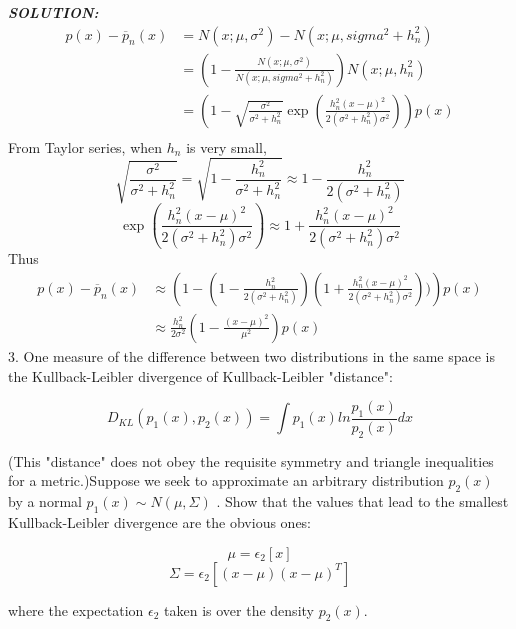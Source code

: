 \documentclass{article}
\theoremstyle{definition}
\theoremstyle{definition}
\theoremstyle{remark}
\begin{document}
\emph{\textbf{SOLUTION:}}\\
\begin{equation}\nonumber
\begin{aligned}
p(x)-\overline{p}_n(x) &= N(x;\mu,\sigma^2)-N(x;\mu,sigma^2+h_n^2)\\
&= (1-\frac{N(x;\mu,\sigma^2)}{N(x;\mu,sigma^2+h_n^2)})N(x;\mu,h_n^2)\\
&= \left(1-\sqrt{\frac{\sigma^2}{\sigma^2+h_n^2}}\exp(\frac{h_n^2(x-\mu)^2}{2(\sigma^2+h_n^2)\sigma^2})\right)p(x)\\
\end{aligned}
\end{equation}
From Taylor series, when $h_n$ is very small,
\[\sqrt{\frac{\sigma^2}{\sigma^2+h_n^2}}=\sqrt{1-\frac{h_n^2}{\sigma^2+h_n^2}}\approx1-\frac{h_n^2}{2(\sigma^2+h_n^2)}\]
\[\exp(\frac{h_n^2(x-\mu)^2}{2(\sigma^2+h_n^2)\sigma^2}) \approx 1+\frac{h_n^2(x-\mu)^2}{2(\sigma^2+h_n^2)\sigma^2}\]
Thus
\begin{equation}\nonumber
\begin{aligned}
p(x)-\overline{p}_n(x) &\approx \left(1-(1-\frac{h_n^2}{2(\sigma^2+h_n^2)})(1+\frac{h_n^2(x-\mu)^2}{2(\sigma^2+h_n^2)\sigma^2}))\right)p(x)\\
&\approx \frac{h_n^2}{2\sigma^2}(1-\frac{(x-\mu)^2}{\mu^2})p(x)
\end{aligned}
\end{equation}
3.  One measure of the difference between two distributions in the same space is the
Kullback-Leibler divergence of Kullback-Leibler "distance":

$$
D_{KL}(p_1(x),p_2(x)) = \int p_1(x)ln\frac{p_1(x)}{p_2(x)}dx
$$


(This "distance" does not obey the requisite symmetry and triangle inequalities for a metric.)Suppose we seek to approximate an arbitrary distribution $p_2(x)$ by a normal $p_1(x)\sim N(\mu,\Sigma)$ .
Show that the values that lead to the smallest Kullback-Leibler divergence are the obvious ones:

$$
\mu = \epsilon_2[x]
$$
$$
\Sigma = \epsilon_2[(x-\mu)(x-\mu)^T]
$$

where the expectation $\epsilon_2$ taken is over the density $p_2(x)$.
\end{document}
